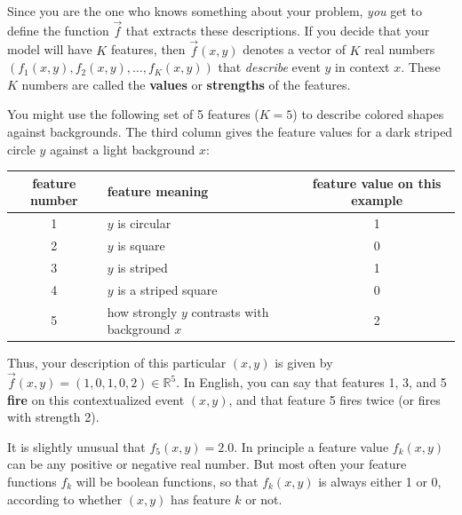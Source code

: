 \documentclass[11pt]{article}
\newcommand{\Real}{{\mathbb R}}
\begin{document}
Since you are the one who knows something about your problem, {\em
  you} get to define the function $\vec{f}$ that extracts these
descriptions.  If you decide that your model will have $K$ features,
then $\vec{f}(x,y)$ denotes a vector of $K$ real numbers $(f_1(x,y),
f_2(x,y), \ldots, f_K(x,y))$ that {\em describe} event $y$ in context
$x$.  These $K$ numbers are called the {\bf values} or {\bf strengths}
of the features.

\medskip

You might use the following set of 5 features ($K=5$) to describe
colored shapes against backgrounds.  The third column gives the
feature values for a dark striped circle $y$ against a light
background $x$:

\smallskip\noindent
\begin{tabular}{|c|l|c|} \hline
feature number & feature meaning   & feature value on this example \\ \hline
1              & $y$ is circular   &    1 \\
2              & $y$ is square     &    0 \\
3              & $y$ is striped    &    1 \\
4              & $y$ is a striped square & 0 \\
5              & how strongly $y$ contrasts with background $x$ & 2 \\ \hline
\end{tabular}
\smallskip

\noindent Thus, your description of this particular $(x,y)$ is given by
$\vec{f}(x,y)=(1,0,1,0,2) \in \Real^5$.  In English, you can say
that features 1, 3, and 5 {\bf fire} on this contextualized event
$(x,y)$, and that feature 5 fires twice (or fires with strength 2).

%

\medskip
It is slightly unusual that $f_5(x,y)=2.0$.  In principle a feature
value $f_k(x,y)$ can be any positive or negative real number.  But
most often your feature functions $f_k$ will be boolean functions, so
that $f_k(x,y)$ is always either 1 or 0, according to whether $(x,y)$
has feature $k$ or not.

\end{document}
